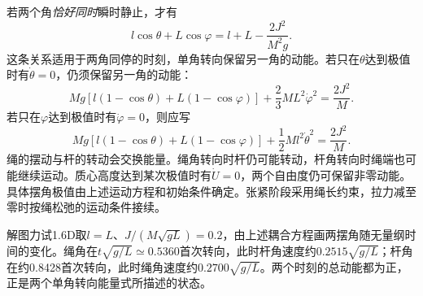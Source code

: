 \documentclass[UTF8,fontset=fandol,a4paper,11pt]{ctexart}
\begin{document}
若两个角\emph{恰好同时}瞬时静止，才有
\[
\boxed{l\cos\theta+L\cos\varphi
=l+L-\frac{2J^2}{M^2g}}.
\]
这条关系适用于两角同停的时刻，单角转向保留另一角的动能。若只在$\theta$达到极值时有$\dot\theta=0$，仍须保留另一角的动能：
\[
Mg[l(1-\cos\theta)+L(1-\cos\varphi)]
+\frac23ML^2\dot\varphi^2=\frac{2J^2}{M}.
\]
若只在$\varphi$达到极值时有$\dot\varphi=0$，则应写
\[
Mg[l(1-\cos\theta)+L(1-\cos\varphi)]
+\frac12Ml^2\dot\theta^2=\frac{2J^2}{M}.
\]
绳的摆动与杆的转动会交换能量。绳角转向时杆仍可能转动，杆角转向时绳端也可能继续运动。质心高度达到某次极值时有$\dot U=0$，两个自由度仍可保留非零动能。具体摆角极值由上述运动方程和初始条件确定。张紧阶段采用绳长约束，拉力减至零时按绳松弛的运动条件接续。

解图力试1.6D取$l=L$、$J/(M\sqrt{gL})=0.2$，由上述耦合方程画两摆角随无量纲时间的变化。绳角在$t\sqrt{g/L}\simeq0.5360$首次转向，此时杆角速度约$0.2515\sqrt{g/L}$；杆角在约0.8428首次转向，此时绳角速度约$0.2700\sqrt{g/L}$。两个时刻的总动能都为正，正是两个单角转向能量式所描述的状态。
\end{document}
